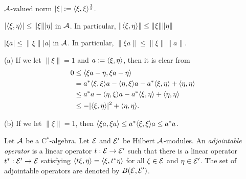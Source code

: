 \documentclass{../../../small}
\begin{document}
\begin{prop}
$\mathcal{A}$-valued norm $|\xi|:=\langle\xi,\xi\rangle^{\frac12}$.
\begin{parts}
\item $|\langle\xi,\eta\rangle|\le\|\xi\||\eta|$ in $\mathcal{A}$. In particular, $\|\langle\xi,\eta\rangle\|\le\|\xi\|\|\eta\|$
\item $|\xi a|\le\|\xi\||a|$ in $\mathcal{A}$. In particular, $\|\xi a\|\le\|\xi\|\|a\|$.
\end{parts}
\end{prop}
\begin{pf}
(a)
If we let $\|\xi\|=1$ and $a:=\langle\xi,\eta\rangle$, then it is clear from
\begin{align*}
0&\le\langle\xi a-\eta,\xi a-\eta\rangle\\
&=a^*\langle\xi,\xi\rangle a-\langle\eta,\xi\rangle a-a^*\langle\xi,\eta\rangle+\langle\eta,\eta\rangle\\
&\le a^*a-\langle\eta,\xi\rangle a-a^*\langle\xi,\eta\rangle+\langle\eta,\eta\rangle\\
&\le-|\langle\xi,\eta\rangle|^2+\langle\eta,\eta\rangle.
\end{align*}

(b)
If we let $\|\xi\|=1$, then $\langle\xi a,\xi a\rangle\le a^*\langle\xi,\xi\rangle a\le a^*a$.
\end{pf}

\begin{defn}
Let $\mathcal{A}$ be a C$^*$-algebra.
Let $\mathcal{E}$ and $\mathcal{E}'$ be Hilbert $\mathcal{A}$-modules.
An \emph{adjointable operator} is a linear operator $t:\mathcal{E}\to\mathcal{E}'$ such that there is a linear operator $t^*:\mathcal{E}'\to\mathcal{E}$ satisfying $\langle t\xi,\eta\rangle=\langle\xi,t^*\eta\rangle$ for all $\xi\in\mathcal{E}$ and $\eta\in\mathcal{E}'$.
The set of adjointable operators are denoted by $B(\mathcal{E},\mathcal{E}')$.
\end{defn}
\end{document}
